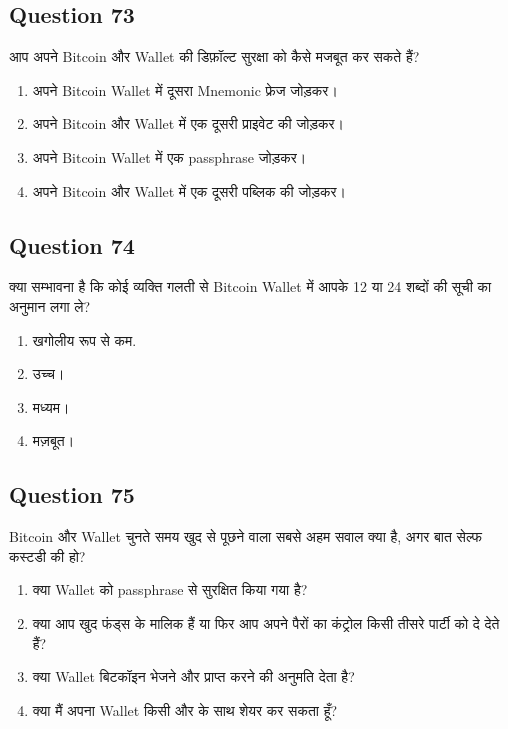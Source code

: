 \documentclass[12pt,a4paper]{article}
\begin{document}
\subsection*{Question 73}
आप अपने Bitcoin और Wallet की डिफ़ॉल्ट सुरक्षा को कैसे मजबूत कर सकते हैं?

\begin{enumerate}[label=\Alph*., leftmargin=*]
\item अपने Bitcoin Wallet में दूसरा Mnemonic फ्रेज जोड़कर।
\item अपने Bitcoin और Wallet में एक दूसरी प्राइवेट की जोड़कर।
\item अपने Bitcoin Wallet में एक passphrase जोड़कर।
\item अपने Bitcoin और Wallet में एक दूसरी पब्लिक की जोड़कर।
\end{enumerate}

\bigskip


\subsection*{Question 74}
क्या सम्भावना है कि कोई व्यक्ति गलती से Bitcoin Wallet में आपके 12 या 24 शब्दों की सूची का अनुमान लगा ले?

\begin{enumerate}[label=\Alph*., leftmargin=*]
\item खगोलीय रूप से कम.
\item उच्च।
\item मध्यम।
\item मज़बूत।
\end{enumerate}

\bigskip


\subsection*{Question 75}
Bitcoin और Wallet चुनते समय खुद से पूछने वाला सबसे अहम सवाल क्या है, अगर बात सेल्फ कस्टडी की हो?

\begin{enumerate}[label=\Alph*., leftmargin=*]
\item क्या Wallet को passphrase से सुरक्षित किया गया है?
\item क्या आप खुद फंड्स के मालिक हैं या फिर आप अपने पैरों का कंट्रोल किसी तीसरे पार्टी को दे देते हैं?
\item क्या Wallet बिटकॉइन भेजने और प्राप्त करने की अनुमति देता है?
\item क्या मैं अपना Wallet किसी और के साथ शेयर कर सकता हूँ?
\end{enumerate}
\end{document}
